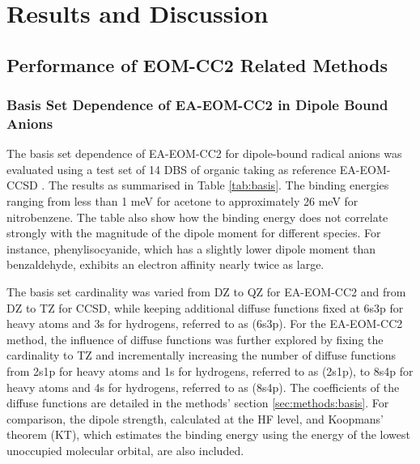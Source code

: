 \chapter{Results and Discussion}

\section{Performance of EOM-CC2 Related Methods}

\subsection{Basis Set Dependence of EA-EOM-CC2 in Dipole Bound Anions}

The basis set dependence of EA-EOM-CC2 for dipole-bound radical anions was evaluated using a test set of 14 DBS of organic taking as reference EA-EOM-CCSD \cite{paran2024performance}. The results as summarised in Table \ref{tab:basis}. The binding energies ranging from less than 1 meV for acetone to approximately 26 meV for nitrobenzene. The table also show how the binding energy does not correlate strongly with the magnitude of the dipole moment for different species. For instance, phenylisocyanide, which has a slightly lower dipole moment than benzaldehyde, exhibits an electron affinity nearly twice as large.

The basis set cardinality was varied from DZ to QZ for EA-EOM-CC2 and from DZ to TZ for CCSD, while keeping additional diffuse functions fixed at 6s3p for heavy atoms and 3s for hydrogens, referred to as (6s3p). For the EA-EOM-CC2 method, the influence of diffuse functions was further explored by fixing the cardinality to TZ and incrementally increasing the number of diffuse functions from 2s1p for heavy atoms and 1s for hydrogens, referred to as (2s1p), to 8s4p for heavy atoms and 4s for hydrogens, referred to as (8s4p). The coefficients of the diffuse functions are detailed in the methods' section \ref{sec:methods:basis}. For comparison, the dipole strength, calculated at the HF level, and Koopmans' theorem (KT), which estimates the binding energy using the energy of the lowest unoccupied molecular orbital, are also included.

